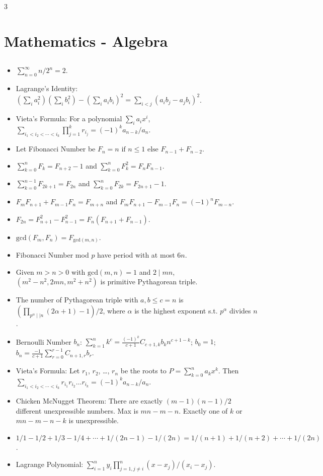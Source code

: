 \documentclass[landscape, 8pt, a4paper, oneside]{extarticle}
\begin{document}
\begin{multicols*}{3}
\section{Mathematics - Algebra}
\subsection{}
\begin{itemize}
	\item $\sum_{n=0}^{\infty} n/2^n = 2$.
	\item Lagrange's Identity: $(\sum_{i} a_i^2)(\sum_{i} b_i^2) - (\sum_{i} a_i b_i)^2 = \sum_{i < j} (a_i b_j - a_j b_i)^2$.
	\item Vieta's Formula: For a polynomial $\sum_i a_i x^i$, $\sum_{i_1 < i_2 < \cdots < i_k} \prod_{j=1}^{k} r_{i_j} = (-1)^k a_{n-k} / a_n$.
	\item Let Fibonacci Number be $F_n = n \text{ if } n \le 1 \text{ else } F_{n-1} + F_{n-2}$.
	\item $\sum_{k=0}^{n} F_k = F_{n+2} - 1$ and $\sum_{k=0}^{n} F_k^2 = F_{n} F_{n-1}$.
	\item $\sum_{k=0}^{n-1} F_{2k+1} = F_{2n}$ and $\sum_{k=0}^{n} F_{2k} = F_{2n+1}-1$.
	\item $F_{m} F_{n+1} + F_{m-1} F_{n} = F_{m+n}$ and $F_{m} F_{n+1} - F_{m-1} F_{n} = (-1)^n F_{m-n}$.
	\item $F_{2n} = F_{n+1}^2 - F_{n-1}^2 = F_n(F_{n+1} + F_{n-1})$.
	\item $\mathrm{gcd}(F_m, F_n) = F_{\mathrm{gcd}(m, n)}$.
	\item Fibonacci Number mod $p$ have period with at most $6n$.
	\item Given $m > n > 0$ with $\mathrm{gcd}(m, n) = 1$ and $2 \mid mn$, $(m^2-n^2, 2mn, m^2+n^2)$ is primitive Pythagorean triple.
	\item The number of Pythagorean triple with $a, b \le c = n$ is $(\prod_{p^\alpha \mid\mid n} (2\alpha + 1) - 1) / 2$, where $\alpha$ is the highest exponent s.t. $p^\alpha$ divides $n$.
	\item Bernoulli Number $b_n$: $\sum_{k=1}^{n} k^c = \frac{(-1)^k}{c+1} C_{c+1, k} b_k n^{c+1-k}$; $b_0 = 1$; $b_n = \frac{-1}{c+1} \sum_{r=0}^{r-1} C_{n+1, r} b_r$.
	\item Vieta's Formula: Let $r_1$, $r_2$, \dots, $r_n$ be the roots to $P = \sum_{k=0}^{n} a_k x^k$. Then $\sum_{i_1 < i_2 < \cdots < i_k} r_{i_1} r_{i_2} \dots r_{i_k} = (-1)^k a_{n-k}/a_n$.
	\item Chicken McNugget Theorem: There are exactly $(m-1)(n-1)/2$ different unexpressible numbers. Max is $mn-m-n$. Exactly one of $k$ or $mn-m-n-k$ is unexpressible.
	\item $1/1 - 1/2 + 1/3 - 1/4 + \cdots + 1/(2n-1) - 1/(2n) = 1/(n+1) + 1/(n+2) + \cdots + 1/(2n)$.
	\item Lagrange Polynomial: $\sum_{i=1}^{n} y_i \prod_{j=1,j \neq i}^{n} (x-x_j)/(x_i-x_j)$.
\end{itemize}

\end{multicols*}
\end{document}

